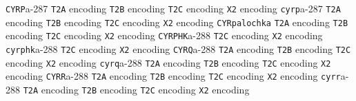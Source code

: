 \documentclass[twoside]{ltxdoc}
\makeatletter
\renewenvironment{theindex}{%
   \@restonecoltrue
   \if@twocolumn\@restonecolfalse\fi
   \columnseprule \z@
   \columnsep 35\p@
   \twocolumn[\index@prologue]%
   \IndexParms
   \let\item\@idxitem
   \ignorespaces
}{\if@restonecol\onecolumn\else\clearpage\fi}
\makeatother
\begin{document}
\begin{theindex}
  \item \texttt  {CYRP}\pfill a-287
    \subitem \texttt  {T2A} encoding\pfill {}
    \subitem \texttt  {T2B} encoding\pfill {}
    \subitem \texttt  {T2C} encoding\pfill {}
    \subitem \texttt  {X2} encoding\pfill {}
  \item \texttt  {cyrp}\pfill a-287
    \subitem \texttt  {T2A} encoding\pfill {}
    \subitem \texttt  {T2B} encoding\pfill {}
    \subitem \texttt  {T2C} encoding\pfill {}
    \subitem \texttt  {X2} encoding\pfill {}
  \item \texttt  {CYRpalochka}\efill 
    \subitem \texttt  {T2A} encoding\pfill {}
    \subitem \texttt  {T2B} encoding\pfill {}
    \subitem \texttt  {T2C} encoding\pfill {}
    \subitem \texttt  {X2} encoding\pfill {}
  \item \texttt  {CYRPHK}\pfill a-288
    \subitem \texttt  {T2C} encoding\pfill {}
    \subitem \texttt  {X2} encoding\pfill {}
  \item \texttt  {cyrphk}\pfill a-288
    \subitem \texttt  {T2C} encoding\pfill {}
    \subitem \texttt  {X2} encoding\pfill {}
  \item \texttt  {CYRQ}\pfill a-288
    \subitem \texttt  {T2A} encoding\pfill {}
    \subitem \texttt  {T2B} encoding\pfill {}
    \subitem \texttt  {T2C} encoding\pfill {}
    \subitem \texttt  {X2} encoding\pfill {}
  \item \texttt  {cyrq}\pfill a-288
    \subitem \texttt  {T2A} encoding\pfill {}
    \subitem \texttt  {T2B} encoding\pfill {}
    \subitem \texttt  {T2C} encoding\pfill {}
    \subitem \texttt  {X2} encoding\pfill {}
  \item \texttt  {CYRR}\pfill a-288
    \subitem \texttt  {T2A} encoding\pfill {}
    \subitem \texttt  {T2B} encoding\pfill {}
    \subitem \texttt  {T2C} encoding\pfill {}
    \subitem \texttt  {X2} encoding\pfill {}
  \item \texttt  {cyrr}\pfill a-288
    \subitem \texttt  {T2A} encoding\pfill {}
    \subitem \texttt  {T2B} encoding\pfill {}
    \subitem \texttt  {T2C} encoding\pfill {}
    \subitem \texttt  {X2} encoding\pfill {}

\end{theindex}
\end{document}
